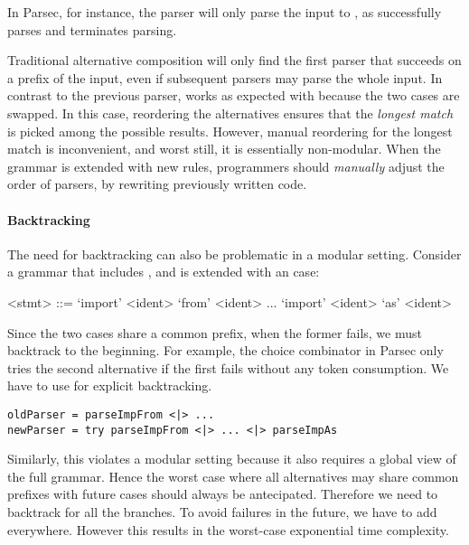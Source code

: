 In Parsec, for instance, the parser  will only parse the input  to , as  successfully parses 
and terminates parsing.

Traditional alternative composition will only find the first parser that succeeds on a prefix of the input,
even if subsequent parsers may parse the whole input. In contrast to the previous parser,  works as expected with because the two cases are swapped.
In this case, reordering the alternatives ensures that
the \emph{longest match} is picked among the possible results. However, manual reordering for the longest match is inconvenient, and worst still, it is essentially non-modular. When the grammar is extended with new rules, programmers should \emph{manually} adjust
the order of parsers, by rewriting previously written code.

\paragraph{Backtracking} The need for backtracking can also be problematic
in a modular setting. Consider a grammar that includes , 
and is extended with an  case:

\setlength{\grammarindent}{5em}
\begin{grammar}
<stmt> ::= `import' <ident> `from' <ident>
    \alt ...
    \alt `import' <ident> `as' <ident>
\end{grammar}
Since the two cases share a common prefix, when the former fails, we must backtrack to the beginning.
For example, the choice combinator in Parsec only tries the second alternative if the first fails
without any token consumption. We have to use  for explicit backtracking.

\begin{lstlisting}[language=PlainCode]
oldParser = parseImpFrom <|> ...
newParser = try parseImpFrom <|> ... <|> parseImpAs
\end{lstlisting}

Similarly, this violates a modular setting because it also requires a global view of the full grammar.
Hence the worst case where all alternatives may share common prefixes with future cases
should always be antecipated. Therefore we need to backtrack for all the branches. To avoid failures in the future, we have to add  everywhere. However this results in the worst-case exponential time
complexity.

